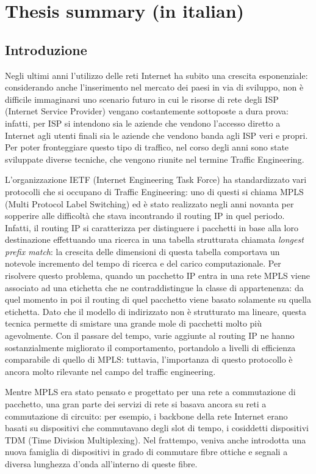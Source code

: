 \documentclass[10pt,a4paper]{report}
\begin{document}
\chapter{Thesis summary (in italian)}

\section*{Introduzione}

Negli ultimi anni l'utilizzo delle reti Internet ha subito una
crescita esponenziale: considerando anche l'inserimento nel mercato
dei paesi in via di sviluppo, non è difficile immaginarsi uno scenario
futuro in cui le risorse di rete degli ISP (Internet Service Provider)
vengano costantemente sottoposte a dura prova: infatti, per ISP si
intendono sia le aziende che vendono l'accesso diretto a Internet agli
utenti finali sia le aziende che vendono banda agli ISP veri e
propri. Per poter fronteggiare questo tipo di traffico, nel corso
degli anni sono state sviluppate diverse tecniche, che vengono riunite
nel termine Traffic Engineering.

L'organizzazione IETF (Internet Engineering Task Force) ha
standardizzato vari protocolli che si occupano di Traffic Engineering:
uno di questi si chiama MPLS (Multi Protocol Label Switching) ed è
stato realizzato negli anni novanta per sopperire alle difficoltà che
stava incontrando il routing IP in quel periodo. Infatti, il routing
IP si caratterizza per distinguere i pacchetti in base alla loro
destinazione effettuando una ricerca in una tabella strutturata
chiamata \textit{longest prefix match}: la crescita delle dimensioni
di questa tabella comportava un notevole incremento del tempo di
ricerca e del carico computazionale. Per risolvere questo problema,
quando un pacchetto IP entra in una rete MPLS viene associato ad una
etichetta che ne contraddistingue la classe di appartenenza: da quel
momento in poi il routing di quel pacchetto viene basato solamente su
quella etichetta. Dato che il modello di indirizzato non è strutturato
ma lineare, questa tecnica permette di smistare una grande mole di
pacchetti molto più agevolmente. Con il passare del tempo, varie
aggiunte al routing IP ne hanno sostanzialmente migliorato il
comportamento, portandolo a livelli di efficienza comparabile di
quello di MPLS: tuttavia, l'importanza di questo protocollo è ancora
molto rilevante nel campo del traffic engineering.

Mentre MPLS era stato pensato e progettato per una rete a commutazione
di pacchetto, una gran parte dei servizi di rete si basava ancora su
reti a commutazione di circuito: per esempio, i backbone della rete
Internet erano basati su dispositivi che commutavano degli slot di
tempo, i cosiddetti dispositivi TDM (Time Division Multiplexing). Nel
frattempo, veniva anche introdotta una nuova famiglia di dispositivi
in grado di commutare fibre ottiche e segnali a diversa lunghezza
d'onda all'interno di queste fibre.
\end{document}

